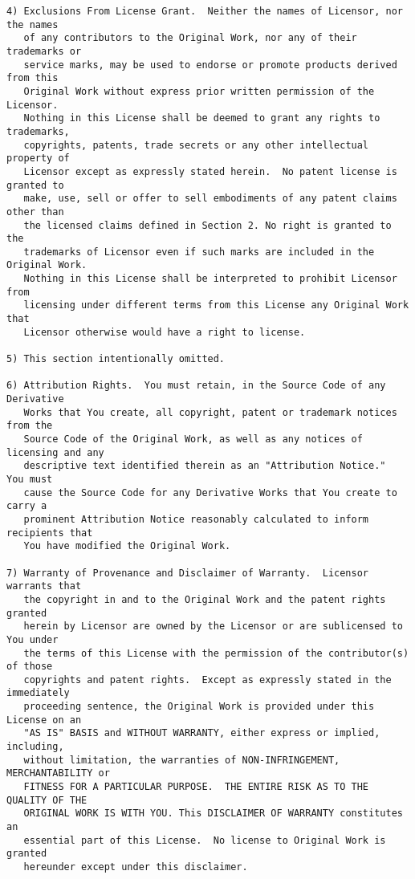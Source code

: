 \begin{verbatim}
4) Exclusions From License Grant.  Neither the names of Licensor, nor the names
   of any contributors to the Original Work, nor any of their trademarks or 
   service marks, may be used to endorse or promote products derived from this
   Original Work without express prior written permission of the Licensor. 
   Nothing in this License shall be deemed to grant any rights to trademarks,
   copyrights, patents, trade secrets or any other intellectual property of
   Licensor except as expressly stated herein.  No patent license is granted to
   make, use, sell or offer to sell embodiments of any patent claims other than
   the licensed claims defined in Section 2. No right is granted to the
   trademarks of Licensor even if such marks are included in the Original Work. 
   Nothing in this License shall be interpreted to prohibit Licensor from
   licensing under different terms from this License any Original Work that
   Licensor otherwise would have a right to license.

5) This section intentionally omitted.

6) Attribution Rights.  You must retain, in the Source Code of any Derivative
   Works that You create, all copyright, patent or trademark notices from the
   Source Code of the Original Work, as well as any notices of licensing and any
   descriptive text identified therein as an "Attribution Notice."  You must 
   cause the Source Code for any Derivative Works that You create to carry a
   prominent Attribution Notice reasonably calculated to inform recipients that
   You have modified the Original Work.

7) Warranty of Provenance and Disclaimer of Warranty.  Licensor warrants that
   the copyright in and to the Original Work and the patent rights granted 
   herein by Licensor are owned by the Licensor or are sublicensed to You under
   the terms of this License with the permission of the contributor(s) of those
   copyrights and patent rights.  Except as expressly stated in the immediately
   proceeding sentence, the Original Work is provided under this License on an
   "AS IS" BASIS and WITHOUT WARRANTY, either express or implied, including,
   without limitation, the warranties of NON-INFRINGEMENT, MERCHANTABILITY or
   FITNESS FOR A PARTICULAR PURPOSE.  THE ENTIRE RISK AS TO THE QUALITY OF THE
   ORIGINAL WORK IS WITH YOU. This DISCLAIMER OF WARRANTY constitutes an
   essential part of this License.  No license to Original Work is granted
   hereunder except under this disclaimer.


\end{verbatim}
